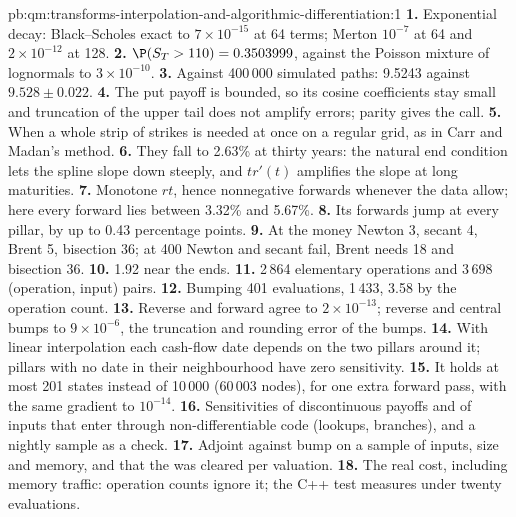 \begin{solution}{pb:qm:transforms-interpolation-and-algorithmic-differentiation:1}
\textbf{1.} Exponential decay: Black--Scholes exact to $7 \times 10^{-15}$ at 64 terms; Merton $10^{-7}$ at 64 and $2 \times 10^{-12}$ at 128.
\textbf{2.} $\P(S_T > 110) = 0.3503999$, against the Poisson mixture of lognormals to $3 \times 10^{-10}$.
\textbf{3.} Against 400\,000 simulated paths: 9.5243 against $9.528 \pm 0.022$.
\textbf{4.} The put payoff is bounded, so its cosine coefficients stay small and truncation of the upper tail does not amplify errors; parity gives the call.
\textbf{5.} When a whole strip of strikes is needed at once on a regular grid, as in Carr and Madan's method.
\textbf{6.} They fall to 2.63\% at thirty years: the natural end condition lets the spline slope down steeply, and $tr'(t)$ amplifies the slope at long maturities.
\textbf{7.} Monotone $rt$, hence nonnegative forwards whenever the data allow; here every forward lies between 3.32\% and 5.67\%.
\textbf{8.} Its forwards jump at every pillar, by up to 0.43 percentage points.
\textbf{9.} At the money Newton 3, secant 4, Brent 5, bisection 36; at 400 Newton and secant fail, Brent needs 18 and bisection 36.
\textbf{10.} 1.92 near the ends.
\textbf{11.} 2\,864 elementary operations and 3\,698 (operation, input) pairs.
\textbf{12.} Bumping 401 evaluations,  1\,433,  3.58 by the operation count.
\textbf{13.} Reverse and forward agree to $2 \times 10^{-13}$; reverse and central bumps to $9 \times 10^{-6}$, the truncation and rounding error of the bumps.
\textbf{14.} With linear interpolation each cash-flow date depends on the two pillars around it; pillars with no date in their neighbourhood have zero sensitivity.
\textbf{15.} It holds at most 201 states instead of 10\,000 (60\,003  nodes), for one extra forward pass, with the same gradient to $10^{-14}$.
\textbf{16.} Sensitivities of discontinuous payoffs and of inputs that enter through non-differentiable code (lookups, branches), and a nightly sample as a check.
\textbf{17.} Adjoint against bump on a sample of inputs,  size and memory, and that the  was cleared per valuation.
\textbf{18.} The real cost, including  memory traffic: operation counts ignore it; the C++ test measures under twenty evaluations.

\end{solution}
